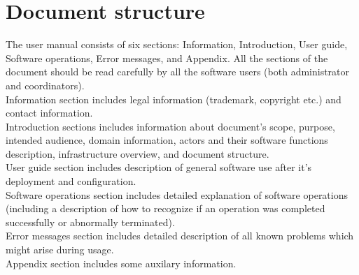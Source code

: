 \section{Document structure}  
The user manual consists of six sections: Information, Introduction, User guide,
Software operations, Error messages, and Appendix. All the sections of the
document should be read carefully by all the software users (both
administrator and coordinators).\\

Information section includes legal information (trademark, copyright etc.) and
contact information.\\

Introduction sections includes information about document's scope, purpose,
intended audience, \mysystemname domain information, actors and their software
functions description, infrastructure overview, and document structure.\\

User guide section includes description of general software use after it's
deployment and configuration.\\

Software operations section includes detailed explanation of \mysystemname
software operations (including a description of how to recognize if an operation
was completed successfully or abnormally terminated).\\

Error messages section includes detailed description of all known problems which
might arise during \mysystemname usage.\\

Appendix section includes some auxilary information.





